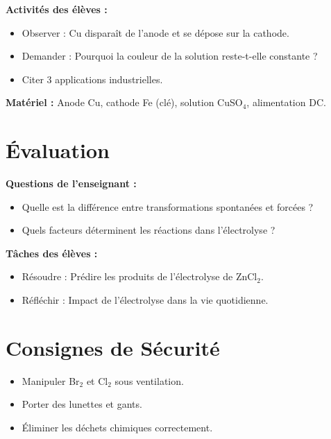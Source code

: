 \documentclass[12pt]{article}
\begin{document}
\textbf{Activités des élèves :}
\begin{itemize}
    \item Observer : Cu disparaît de l’anode et se dépose sur la cathode.
    \item Demander : Pourquoi la couleur de la solution reste-t-elle constante ?
    \item Citer 3 applications industrielles.
\end{itemize}

\textbf{Matériel :} Anode Cu, cathode Fe (clé), solution CuSO\(_{4}\), alimentation DC.

\section{Évaluation}
\textbf{Questions de l’enseignant :}
\begin{itemize}
    \item  Quelle est la différence entre transformations spontanées et forcées ?
    \item  Quels facteurs déterminent les réactions dans l’électrolyse ? 
\end{itemize}

\textbf{Tâches des élèves :}
\begin{itemize}
    \item Résoudre :  Prédire les produits de l’électrolyse de ZnCl\(_{2}\).
    \item Réfléchir : Impact de l’électrolyse dans la vie quotidienne. 
\end{itemize}

\section{Consignes de Sécurité}
\begin{itemize}
    \item Manipuler Br\(_{2}\) et Cl\(_{2}\) sous ventilation.
    \item Porter des lunettes et gants.
    \item Éliminer les déchets chimiques correctement.
\end{itemize}
\end{document}
